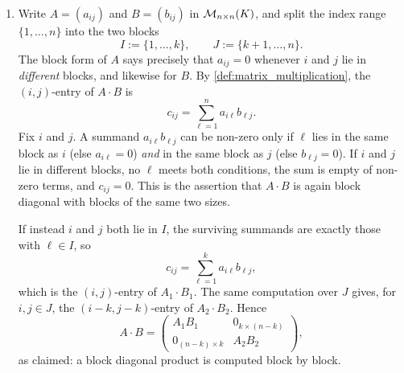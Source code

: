 \begin{exercisesolution}
\label{sol:block_diagonal_upper_triangular_mult}
\begin{enumerate}[label=\textbf{(\alph*)}]
    \item Write $A = (a_{ij})$ and $B = (b_{ij})$ in $\mathcal{M}_{n \times n}(K)$, and split the index range $\{1, \dots, n\}$ into the two blocks
    \[
        I := \{1, \dots, k\}, \qquad J := \{k+1, \dots, n\}.
    \]
    The block form of $A$ says precisely that $a_{ij} = 0$ whenever $i$ and $j$ lie in \emph{different} blocks, and likewise for $B$. By \cref{def:matrix_multiplication}, the $(i,j)$-entry of $A \cdot B$ is
    \[
        c_{ij} = \sum_{\ell = 1}^{n} a_{i\ell} b_{\ell j}.
    \]
    Fix $i$ and $j$. A summand $a_{i\ell} b_{\ell j}$ can be non-zero only if $\ell$ lies in the same block as $i$ (else $a_{i\ell} = 0$) \emph{and} in the same block as $j$ (else $b_{\ell j} = 0$). If $i$ and $j$ lie in different blocks, no $\ell$ meets both conditions, the sum is empty of non-zero terms, and $c_{ij} = 0$. This is the assertion that $A \cdot B$ is again block diagonal with blocks of the same two sizes.

    If instead $i$ and $j$ both lie in $I$, the surviving summands are exactly those with $\ell \in I$, so
    \[
        c_{ij} = \sum_{\ell = 1}^{k} a_{i\ell} b_{\ell j},
    \]
    which is the $(i,j)$-entry of $A_1 \cdot B_1$. The same computation over $J$ gives, for $i, j \in J$, the $(i-k, j-k)$-entry of $A_2 \cdot B_2$. Hence
    \[
        A \cdot B = \begin{pmatrix} A_1 B_1 & 0_{k \times (n-k)} \\ 0_{(n-k) \times k} & A_2 B_2 \end{pmatrix},
    \]
    as claimed: a block diagonal product is computed block by block.


\end{enumerate}
\end{exercisesolution}

